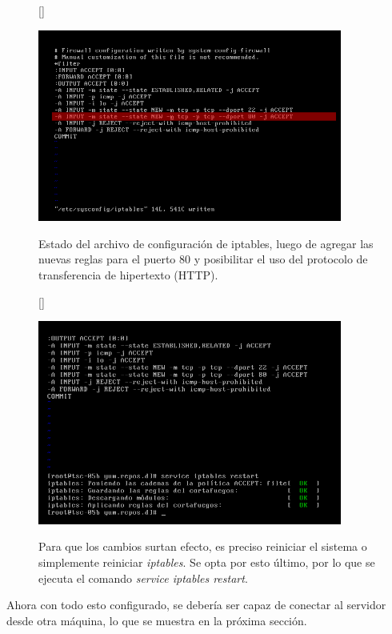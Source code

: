 \documentclass[11pt]{article}
\begin{document}
\clearpage

\begin{figure}[ht]
[\FBwidth]
{\caption{Estado del archivo de configuración de iptables, luego de agregar las nuevas reglas para el puerto 80 y posibilitar el uso del protocolo de transferencia de hipertexto (HTTP).}\label{fig:iptablesAfter}}
{\includegraphics[width=10cm]{screenshots/iptables-config/vi-iptables-port-80-enabled.png}}
\end{figure}

\begin{figure}[ht]
[\FBwidth]
{\caption{Para que los cambios surtan efecto, es preciso reiniciar el sistema o simplemente reiniciar \textit{iptables}. Se opta por esto último, por lo que se ejecuta el comando \textit{service iptables restart}.}\label{fig:iptablesRestart}}
{\includegraphics[width=10cm]{screenshots/iptables-config/iptables-restart.png}}
\end{figure}


Ahora con todo esto configurado, se debería ser capaz de conectar al servidor desde otra máquina, lo que se muestra en la próxima sección.
\end{document}
